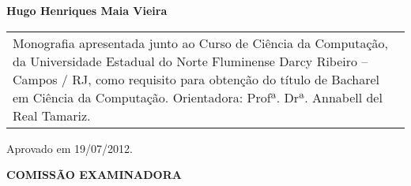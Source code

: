 \begin{folhadeaprovacao}
  \thispagestyle{empty}
  \center
  \textbf{Hugo Henriques Maia Vieira}
  \vfill

  \center{\textbf{\Large{\textit{\meutitulo}}}}

  \hspace*{2cm}
  \begin{table}[h!]
    \raggedleft
    \begin{tabular}{p{7cm}}
    Monografia apresentada junto ao Curso de Ciência da Computação, da Universidade Estadual do Norte Fluminense Darcy Ribeiro – Campos / RJ, como requisito para obtenção do título de Bacharel em Ciência da Computação.
    Orientadora: Profª. Drª. Annabell del Real Tamariz.
    \end{tabular}
  \end{table}

  \hspace*{2cm}
  \raggedright Aprovado em 19/07/2012.

  \center
  \textbf{COMISSÃO EXAMINADORA}

  \setlength{\ABNTsignthickness}{0.4pt} \setlength{\ABNTsignskip}{1.7cm}

\end{folhadeaprovacao}